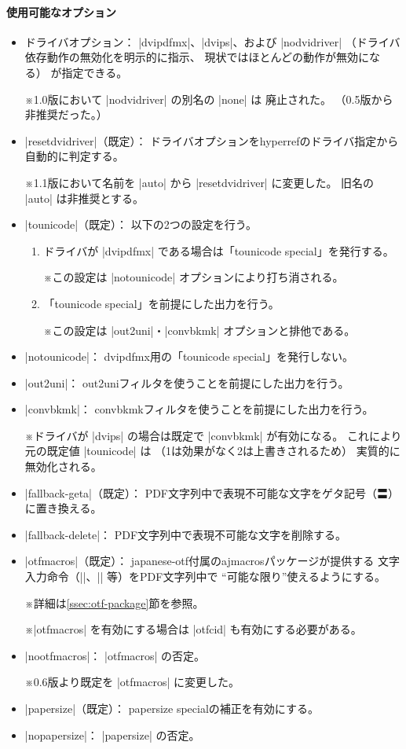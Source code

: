 \documentclass[uplatex,dvipdfmx,a4paper]{jsarticle}
\newcommand{\Pkg}[1]{\textsf{#1}}
\newcommand{\Note}{\par\noindent ※}
\newcommand{\Means}{：\quad}
\providecommand{\Strong}[1]{\textsf{#1}}
\begin{document}
\paragraph{使用可能なオプション}\mbox{}
\begin{itemize}
\item \Strong{ドライバオプション}\Means
  |dvipdfmx|、|dvips|、および |nodvidriver|%
  （ドライバ依存動作の無効化を明示的に指示、
  現状ではほとんどの動作が無効になる）
  が指定できる。
  \Note 1.0版において |nodvidriver| の別名の |none| は
    \Strong{廃止}された。
    （0.5版から非推奨だった。）
\item |resetdvidriver|（既定）\Means
  ドライバオプションを\Pkg{hyperref}のドライバ指定から自動的に判定する。
  \Note 1.1版において名前を |auto| から |resetdvidriver| に変更した。
    旧名の |auto| は\Strong{非推奨}とする。
\item |tounicode|（既定）\Means
  以下の2つの設定を行う。
  \begin{enumerate}
  \item ドライバが |dvipdfmx| である場合は「tounicode special」を発行する。
    \Note この設定は |notounicode| オプションにより打ち消される。
  \item 「tounicode special」を前提にした出力を行う。
    \Note この設定は |out2uni|・|convbkmk| オプションと排他である。
  \end{enumerate}
\item |notounicode|\Means
  dvipdfmx用の「tounicode special」を発行しない。
\item |out2uni|\Means
  out2uniフィルタを使うことを前提にした出力を行う。
\item |convbkmk|\Means
  convbkmkフィルタを使うことを前提にした出力を行う。
  \Note ドライバが |dvips| の場合は既定で |convbkmk| が有効になる。
  これにより元の既定値 |tounicode| は
  （1は効果がなく2は上書きされるため）
  実質的に無効化される。
\item |fallback-geta|（既定）\Means
  PDF文字列中で表現不可能な文字をゲタ記号（〓）に置き換える。
\item |fallback-delete|\Means
  PDF文字列中で表現不可能な文字を削除する。
\item |otfmacros|（既定）\Means
  \Pkg{japanese-otf}付属の\Pkg{ajmacros}パッケージが提供する
  文字入力命令（|\ajMaru|、|\ajLig| 等）をPDF文字列中で
  “可能な限り”使えるようにする。
  \Note 詳細は\ref{ssec:otf-package}節を参照。
  \Note |otfmacros| を有効にする場合は |otfcid| も有効にする必要がある。
\item |nootfmacros|\Means
  |otfmacros| の否定。
  \Note 0.6版より既定を |otfmacros| に変更した。
\item |papersize|（既定）\Means
  papersize specialの補正を有効にする。
\item |nopapersize|\Means
  |papersize| の否定。
\end{itemize}
\end{document}
